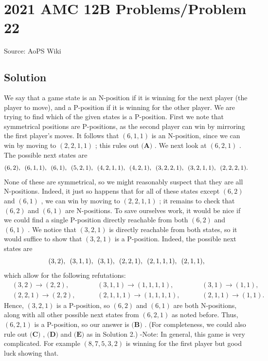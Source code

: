 \documentclass[12pt]{article}
\begin{document}
\section*{{2021 AMC 12B Problems/Problem 22}}
Source: AoPS Wiki

\subsection*{Solution}
We say that a game state is an N-position if it is winning for the next player (the player to move), and a P-position if it is winning for the other player. We are trying to find which of the given states is a P-position. First we note that symmetrical positions are P-positions, as the second player can win by mirroring the first player's moves. It follows that $(6, 1, 1)$ is an N-position, since we can win by moving to $(2, 2, 1, 1)$ ; this rules out $\textbf{(A)}$ . We next look at $(6, 2, 1)$ . The possible next states are \[(6, 2), \enskip (6, 1, 1), \enskip (6, 1), \enskip (5, 2, 1), \enskip (4, 2, 1, 1), \enskip (4, 2, 1), \enskip (3, 2, 2, 1), \enskip (3, 2, 1, 1), \enskip (2, 2, 2, 1).\] None of these are symmetrical, so we might reasonably suspect that they are all N-positions. Indeed, it just so happens that for all of these states except $(6, 2)$ and $(6, 1)$ , we can win by moving to $(2, 2, 1, 1)$ ; it remains to check that $(6, 2)$ and $(6, 1)$ are N-positions. To save ourselves work, it would be nice if we could find a single P-position directly reachable from both $(6, 2)$ and $(6, 1)$ . We notice that $(3, 2, 1)$ is directly reachable from both states, so it would suffice to show that $(3, 2, 1)$ is a P-position. Indeed, the possible next states are \[(3, 2), \enskip (3, 1, 1), \enskip (3, 1), \enskip (2, 2, 1), \enskip (2, 1, 1, 1), \enskip (2, 1, 1),\] which allow for the following refutations: \begin{align*} &(3, 2) \to (2, 2), && &&(3, 1, 1) \to (1, 1, 1, 1), && &&(3, 1) \to (1, 1), \\ &(2, 2, 1) \to (2, 2), && &&(2, 1, 1, 1) \to (1, 1, 1, 1), && &&(2, 1, 1) \to (1, 1). \end{align*} Hence, $(3, 2, 1)$ is a P-position, so $(6, 2)$ and $(6, 1)$ are both N-positions, along with all other possible next states from $(6, 2, 1)$ as noted before. Thus, $(6, 2, 1)$ is a P-position, so our answer is $\boxed{\textbf{(B)}}$ . (For completeness, we could also rule out $\textbf{(C)}$ , $\textbf{(D)}$ and $\textbf{(E)}$ as in Solution 2.) -Note: In general, this game is very complicated. For example $(8, 7, 5, 3, 2)$ is winning for the first player but good luck showing that.
\end{document}
